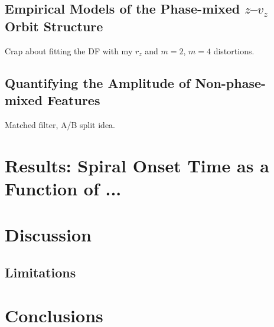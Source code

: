 \subsection{Empirical Models of the Phase-mixed $z$--$v_z$ Orbit Structure}
\label{sec:zvz-structure}

Crap about fitting the DF with my $r_z$ and $m=2$, $m=4$ distortions.


\subsection{Quantifying the Amplitude of Non-phase-mixed Features}
\label{sec:residuals}

Matched filter, A/B split idea.


\section{Results: Spiral Onset Time as a Function of ...}
\label{sec:results}


\section{Discussion} \label{sec:discussion}

\subsection{Limitations}
\label{sec:limitations}


\section{Conclusions} \label{sec:conclusions}


